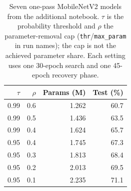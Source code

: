 \begin{table}[t]
  \caption{Seven one-pass MobileNetV2 models from the additional
    notebook. $\tau$ is the probability threshold and $\rho$ the
    parameter-removal cap (\texttt{thr}/\texttt{max\_param} in run names);
    the cap is not the achieved parameter share. Each setting uses
    one 30-epoch search and one 45-epoch recovery phase.}
  \label{tab:mbv2-one-iteration}
  \centering
  \small
  \begin{tabular}{@{}rrrr@{}}
    \toprule
    $\tau$ & $\rho$ & Params (M) & Test (\%) \\
    \midrule
    0.99 & 0.6 & 1.262 & 60.7 \\
    0.99 & 0.5 & 1.436 & 63.5 \\
    0.99 & 0.4 & 1.624 & 65.7 \\
    0.95 & 0.4 & 1.745 & 67.3 \\
    0.95 & 0.3 & 1.813 & 68.4 \\
    0.95 & 0.2 & 2.013 & 69.5 \\
    0.95 & 0.1 & 2.235 & 71.1 \\
    \bottomrule
  \end{tabular}
\end{table}

